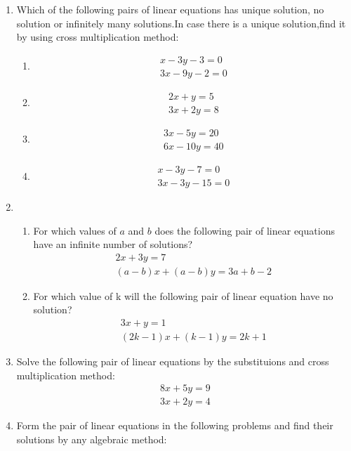 \begin{enumerate}
\item Which of the following pairs of linear equations has unique solution, no solution or infinitely many solutions.In case there is a unique solution,find it by using cross multiplication method:
  \begin{enumerate}[label=(\roman*)]
	\item \begin{align}
	x-3y-3=0\\
	3x-9y-2=0
        \end{align}
       \item \begin{align}
	2x+y=5\\
	3x+2y=8
	\end{align}
	\item \begin{align}
	3x-5y=20\\
	6x-10y=40
	\end{align}
	\item \begin{align}
	x-3y-7=0\\
	3x-3y-15=0
        \end{align}
 \end{enumerate}
\item 
  \begin{enumerate}[label=(\roman*)]
  \item For which values of $a$ and $b$ does the following pair of linear equations have an infinite number of solutions?
	\begin{align}
	2x+3y=7\\
	(a-b)x+(a-b)y=3a+b-2
	\end{align}
  \item For which value of k will the following pair of linear equation have no solution?
	\begin{align}
	3x+y=1\\
	(2k-1)x+(k-1)y=2k+1
	\end{align}
   \end{enumerate}
\item Solve the following pair of linear equations by the substituions and cross multiplication method:
\begin{align}
8x+5y=9
\\ 3x+2y=4
\end{align}
\item Form the pair of linear equations in the following problems and find their solutions by any algebraic method:

\end{enumerate}
